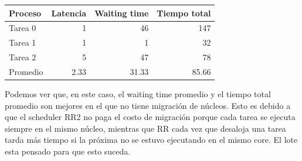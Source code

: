 \begin{tabular}{l | r | r | r }
  Proceso & Latencia & Waiting time & Tiempo total\\
  \hline
  Tarea 0 & 1 & 46 &  147\\
  Tarea 1 & 1 & 1 &  32\\
  Tarea 2 & 5 & 47 & 78 \\
  Promedio & 2.33 & 31.33 & 85.66 \\
\end{tabular}

Podemos ver que, en este caso, el waiting time promedio y el tiempo total promedio son mejores en el que no tiene migración de núcleos. Esto es debido a que el scheduler RR2
no paga el costo de migración porque cada tarea se ejecuta siempre en el mismo núcleo, mientras que RR cada vez que desaloja una tarea tarda más tiempo si la próxima no se estuvo
ejecutando en el mismo core. El lote esta pensado para que esto suceda.
